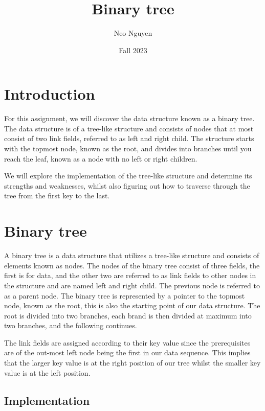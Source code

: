 \documentclass[a4paper,11pt]{article}
\begin{document}
\title{
    \textbf{Binary tree}
}
\author{Neo Nguyen}
\date{Fall 2023}

\maketitle

\section*{Introduction}

    For this assignment, we will discover the data structure known as a binary tree. The data structure is of a tree-like structure and consists of nodes that at most consist of two link fields, referred to as left and right child. The structure starts with the topmost node, known as the root, and divides into branches until you reach the leaf, known as a node with no left or right children.

    We will explore the implementation of the tree-like structure and determine its strengths and weaknesses, whilst also figuring out how to traverse through the tree from the first key to the last.
    
\section*{Binary tree}

    A binary tree is a data structure that utilizes a tree-like structure and consists of elements known as nodes. The nodes of the binary tree consist of three fields, the first is for data, and the other two are referred to as link fields to other nodes in the structure and are named left and right child. The previous node is referred to as a parent node. The binary tree is represented by a pointer to the topmost node, known as the root, this is also the starting point of our data structure. The root is divided into two branches, each brand is then divided at maximum into two branches, and the following continues. 
    
    The link fields are assigned according to their key value since the prerequisites are of the out-most left node being the first in our data sequence. This implies that the larger key value is at the right position of our tree whilst the smaller key value is at the left position.   

    \subsection*{Implementation}
\end{document}
